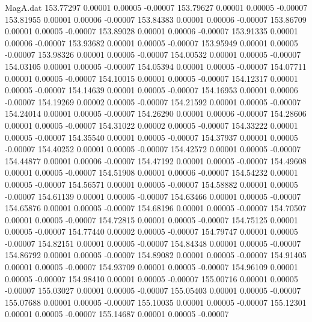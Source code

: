 \begin{filecontents}{MagA.dat}
 153.77297    0.00001    0.00005   -0.00007
 153.79627    0.00001    0.00005   -0.00007
 153.81955    0.00001    0.00006   -0.00007
 153.84383    0.00001    0.00006   -0.00007
 153.86709    0.00001    0.00005   -0.00007
 153.89028    0.00001    0.00006   -0.00007
 153.91335    0.00001    0.00006   -0.00007
 153.93682    0.00001    0.00005   -0.00007
 153.95949    0.00001    0.00005   -0.00007
 153.98326    0.00001    0.00005   -0.00007
 154.00532    0.00001    0.00005   -0.00007
 154.03105    0.00001    0.00005   -0.00007
 154.05394    0.00001    0.00005   -0.00007
 154.07711    0.00001    0.00005   -0.00007
 154.10015    0.00001    0.00005   -0.00007
 154.12317    0.00001    0.00005   -0.00007
 154.14639    0.00001    0.00005   -0.00007
 154.16953    0.00001    0.00006   -0.00007
 154.19269    0.00002    0.00005   -0.00007
 154.21592    0.00001    0.00005   -0.00007
 154.24014    0.00001    0.00005   -0.00007
 154.26290    0.00001    0.00006   -0.00007
 154.28606    0.00001    0.00005   -0.00007
 154.31022    0.00002    0.00005   -0.00007
 154.33222    0.00001    0.00005   -0.00007
 154.35540    0.00001    0.00005   -0.00007
 154.37937    0.00001    0.00005   -0.00007
 154.40252    0.00001    0.00005   -0.00007
 154.42572    0.00001    0.00005   -0.00007
 154.44877    0.00001    0.00006   -0.00007
 154.47192    0.00001    0.00005   -0.00007
 154.49608    0.00001    0.00005   -0.00007
 154.51908    0.00001    0.00006   -0.00007
 154.54232    0.00001    0.00005   -0.00007
 154.56571    0.00001    0.00005   -0.00007
 154.58882    0.00001    0.00005   -0.00007
 154.61139    0.00001    0.00005   -0.00007
 154.63466    0.00001    0.00005   -0.00007
 154.65876    0.00001    0.00005   -0.00007
 154.68196    0.00001    0.00005   -0.00007
 154.70507    0.00001    0.00005   -0.00007
 154.72815    0.00001    0.00005   -0.00007
 154.75125    0.00001    0.00005   -0.00007
 154.77440    0.00002    0.00005   -0.00007
 154.79747    0.00001    0.00005   -0.00007
 154.82151    0.00001    0.00005   -0.00007
 154.84348    0.00001    0.00005   -0.00007
 154.86792    0.00001    0.00005   -0.00007
 154.89082    0.00001    0.00005   -0.00007
 154.91405    0.00001    0.00005   -0.00007
 154.93709    0.00001    0.00005   -0.00007
 154.96109    0.00001    0.00005   -0.00007
 154.98410    0.00001    0.00005   -0.00007
 155.00716    0.00001    0.00005   -0.00007
 155.03027    0.00001    0.00005   -0.00007
 155.05403    0.00001    0.00005   -0.00007
 155.07688    0.00001    0.00005   -0.00007
 155.10035    0.00001    0.00005   -0.00007
 155.12301    0.00001    0.00005   -0.00007
 155.14687    0.00001    0.00005   -0.00007

\end{filecontents}
